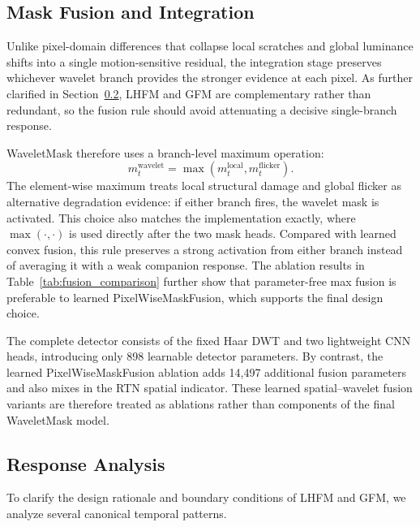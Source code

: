 {\subsection{Mask Fusion and Integration}\label{subsec:integration}

Unlike pixel-domain differences that collapse local scratches and global luminance shifts into a single motion-sensitive residual, the integration stage preserves whichever wavelet branch provides the stronger evidence at each pixel. As further clarified in Section~\ref{subsec:response_analysis}, LHFM and GFM are complementary rather than redundant, so the fusion rule should avoid attenuating a decisive single-branch response.

WaveletMask therefore uses a branch-level maximum operation:
\begin{equation}\label{eq:wavelet_mask}
    m_t^{\mathrm{wavelet}}=\max(m_t^{\mathrm{local}},m_t^{\mathrm{flicker}}).
\end{equation}
The element-wise maximum treats local structural damage and global flicker as alternative degradation evidence: if either branch fires, the wavelet mask is activated. This choice also matches the implementation exactly, where $\max(\cdot,\cdot)$ is used directly after the two mask heads. Compared with learned convex fusion, this rule preserves a strong activation from either branch instead of averaging it with a weak companion response. The ablation results in Table~\ref{tab:fusion_comparison} further show that parameter-free max fusion is preferable to learned PixelWiseMaskFusion, which supports the final design choice.

The complete detector consists of the fixed Haar DWT and two lightweight CNN heads, introducing only 898 learnable detector parameters. By contrast, the learned PixelWiseMaskFusion ablation adds 14,497 additional fusion parameters and also mixes in the RTN spatial indicator. These learned spatial--wavelet fusion variants are therefore treated as ablations rather than components of the final WaveletMask model.

\subsection{Response Analysis}\label{subsec:response_analysis}

To clarify the design rationale and boundary conditions of LHFM and GFM, we analyze several canonical temporal patterns.

}
